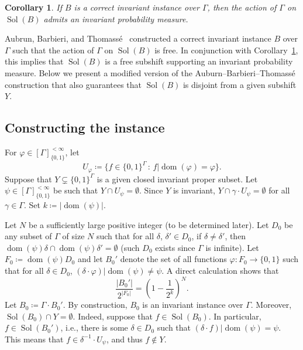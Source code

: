 \documentclass[12pt]{amsart}
\newtheorem{corl}[theo]{Corollary}
\theoremstyle{definition}
\theoremstyle{remark}
\newcommand{\0}{\emptyset}
\newcommand{\set}[1]{\{#1\}}
\newcommand{\dom}{\operatorname{dom}}
\renewcommand{\phi}{\varphi}
\numberwithin{equation}{section}
\begin{document}
	\begin{corl}\label{corl:inv_meas}
		If ${B}$ is a correct invariant instance over $\Gamma$, then the action of $\Gamma$ on $\operatorname{Sol}({B})$ admits an invariant probability measure.
	\end{corl}
	
	Aubrun, Barbieri, and Thomass\'e~\cite{ABT} constructed a correct invariant instance $B$ over $\Gamma$ such that the action of $\Gamma$ on $\operatorname{Sol}({B})$ is free. In conjunction with Corollary~\ref{corl:inv_meas}, this implies that $\operatorname{Sol}(B)$ is a free subshift supporting an invariant probability measure. Below we present a modified version of the Auburn--Barbieri--Thomass\'e construction that also guarantees that $\operatorname{Sol}(B)$ is disjoint from a given subshift $Y$.
	
	\subsection{Constructing the instance}
	
	For $\phi \in [\Gamma]^{<\infty}_{\set{0,1}}$, let
	$$
		U_\phi \coloneqq \set{f \in \set{0,1}^\Gamma \,:\, f \vert \dom(\phi) = \phi}.
	$$
	Suppose that $Y \subsetneq \set{0,1}^\Gamma$ is a given closed invariant proper subset. Let $\psi \in [\Gamma]^{<\infty}_{\set{0,1}}$ be such that $Y \cap U_\psi = \0$. Since $Y$ is invariant, $Y \cap \gamma \cdot U_\psi = \0$ for all $\gamma \in \Gamma$. Set $k \coloneqq |\dom(\psi)|$.
	
	Let $N$ be a sufficiently large positive integer (to be determined later). Let $D_0$ be any subset of $\Gamma$ of size $N$ such that for all $\delta$, $\delta' \in D_0$, if $\delta \neq \delta'$, then $\dom(\psi) \delta \cap \dom(\psi) \delta' = \0$ (such $D_0$ exists since $\Gamma$ is infinite). Let $F_0 \coloneqq \dom(\psi) D_0$ and let $B_0'$ denote the set of all functions $\phi \colon F_0 \to \set{0,1}$ such that for all $\delta\in D_0$, $(\delta \cdot \phi)\vert \dom(\psi) \neq \psi$. A direct calculation shows that
	\begin{equation}\label{eq:zero_bound}
		\frac{|B_0'|}{2^{|F_0|}} = \left(1 - \frac{1}{2^k}\right)^N.
	\end{equation}
	Let $B_0 \coloneqq \Gamma \cdot B_0'$. By construction, $B_0$ is an invariant instance over $\Gamma$. Moreover, $\operatorname{Sol}(B_0) \cap Y = \0$. Indeed, suppose that $f \in \operatorname{Sol}(B_0)$. In particular, $f \in \operatorname{Sol}(B_0')$, i.e., there is some $\delta \in D_0$ such that $(\delta \cdot f) \vert \dom(\psi) =\psi$. This means that $f \in \delta^{-1} \cdot U_\psi$, and thus $f \not \in Y$.
	
\end{document}
